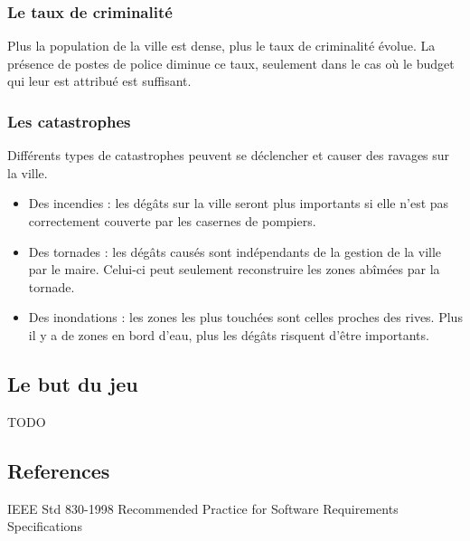 \subsubsection{Le taux de criminalité}
Plus la population de la ville est dense, plus le taux de criminalité évolue. La présence de postes de police diminue ce taux, seulement dans le cas où le budget qui leur est attribué est suffisant.

\subsubsection{Les catastrophes}
Différents types de catastrophes peuvent se déclencher et causer des ravages sur la ville.
\begin{itemize}
\item Des incendies : les dégâts sur la ville seront plus importants si elle n'est pas correctement couverte par les casernes de pompiers.
\item Des tornades : les dégâts causés sont indépendants de la gestion de la ville par le maire. Celui-ci peut seulement reconstruire les zones abîmées par la tornade.
\item Des inondations : les zones les plus touchées sont celles proches des rives. Plus il y a de zones en bord d'eau, plus les dégâts risquent d'être importants.
\end{itemize}

\subsection{Le but du jeu}

TODO

\subsection{References}
IEEE Std 830-1998 Recommended Practice for Software Requirements Specifications
